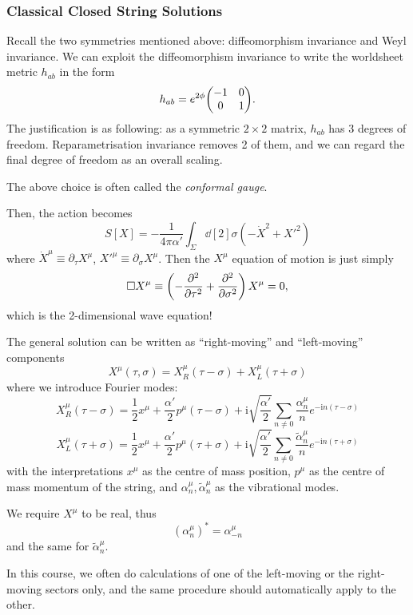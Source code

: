 \documentclass[a4paper,11pt]{article}
\begin{document}
	\subsubsection{Classical Closed String Solutions}

	Recall the two symmetries mentioned above: diffeomorphism invariance and Weyl invariance. We can exploit the diffeomorphism invariance to write the worldsheet metric $h _{a b}$ in the form 
	\[
		h _{a b} = e ^{2 \phi} \mqty(-1 & 0\\0 & 1).
	\]
	The justification is as following: as a symmetric $2 \times 2$ matrix, $h _{a b}$ has 3 degrees of freedom. Reparametrisation invariance removes 2 of them, and we can regard the final degree of freedom as an overall scaling.

	The above choice is often called the \emph{conformal gauge}.

	Then, the action becomes 
	\[
		S[X] = - \frac{1}{4 \pi \alpha'} \int_\Sigma \dd[2]{\sigma} \left(  - \dot X^2 + X'^2 \right)
	\]
	where $\dot X^\mu \equiv \partial_\tau X^\mu$, $X'^\mu \equiv \partial_\sigma X^\mu$. Then the $X^\mu$ equation of motion is just simply 
	\[
		\square X^\mu \equiv \left( - \pdv[2]{\tau} + \pdv[2]{\sigma} \right) X^\mu = 0,
	\]
	which is the 2-dimensional wave equation!
	
	The general solution can be written as ``right-moving'' and ``left-moving'' components
	\[
		X^\mu (\tau,\sigma) = X^\mu_R (\tau - \sigma) + X^\mu_L (\tau + \sigma)
	\]
	where we introduce Fourier modes:
	\[
		X^\mu_R (\tau - \sigma) = \frac{1}{2} x^\mu + \frac{\alpha'}{2} p^\mu (\tau - \sigma) + \mathrm{i} \sqrt{\frac{\alpha'}{2}} \sum _{n \neq 0} \frac{\alpha^\mu_n}{n} e ^{- \mathrm{i} n (\tau - \sigma)}
	\]
	\[
		X^\mu_L (\tau + \sigma) = \frac{1}{2} x^\mu + \frac{\alpha'}{2} p^\mu (\tau + \sigma) + \mathrm{i} \sqrt{\frac{\alpha'}{2}} \sum _{n \neq 0} \frac{\tilde \alpha^\mu_n}{n} e ^{- \mathrm{i} n (\tau + \sigma)}
	\]
	with the interpretations $x^\mu$ as the centre of mass position, $p^\mu$ as the centre of mass momentum of the string, and $\alpha^\mu_n, \tilde \alpha^\mu_n$ as the vibrational modes.

	We require $X^\mu$ to be real, thus 
	\[
		\left( \alpha^\mu_n \right)^* = \alpha^\mu _{-n}
	\]
	and the same for $\tilde \alpha^\mu_n$.

	In this course, we often do calculations of one of the left-moving or the right-moving sectors only, and the same procedure should automatically apply to the other.
	
\end{document}
